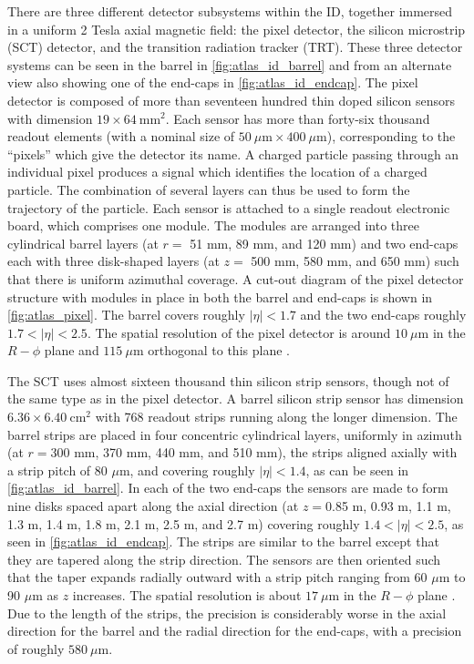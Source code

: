There are three different detector subsystems within the ID, together
immersed in a uniform 2 Tesla axial magnetic field: the pixel detector,
the silicon microstrip (SCT) detector, and the transition radiation
tracker (TRT). These three detector systems can be seen 
in the barrel in \fig\ref{fig:atlas_id_barrel} and from an alternate
view also showing one of the end-caps in \fig\ref{fig:atlas_id_endcap}. 
The pixel detector
is composed of more than seventeen hundred thin doped silicon sensors with 
dimension $19\times 64~\textrm{mm}^2$. Each sensor has more than forty-six
thousand readout elements (with a 
nominal size of $50 ~\mu\textrm{m} \times 400~\mu\textrm{m}$),
corresponding to the ``pixels'' which give the detector its name. 
A charged particle passing through an individual pixel produces a signal
which identifies the location of a charged particle. The combination of 
several layers can thus be used to form the trajectory of the particle. %
Each sensor is attached to a single readout electronic board, which comprises
one module.
The modules are arranged into three cylindrical barrel layers (at 
$r = $ 51 mm, 89 mm, and 120 mm)  and 
two end-caps each with three disk-shaped layers (at $z = $ 500 mm, 580 mm, 
and 650 mm) such that there is uniform
azimuthal coverage. A cut-out diagram of the pixel detector 
structure with modules in place in both the barrel and end-caps is shown 
in \fig\ref{fig:atlas_pixel}. The barrel covers roughly 
$|\eta|<1.7$ and the two end-caps roughly $1.7<|\eta|<2.5$.
The 
spatial resolution of the pixel detector is around $10~\mu\textrm{m}$ in 
the $R-\phi$ plane and $115 ~\mu\textrm{m}$ 
orthogonal to this plane \cite{ATLAS-CONF-2014-047}.



The SCT uses almost sixteen thousand thin silicon strip sensors, though not of the 
same type as in the pixel detector. 
A barrel silicon strip sensor has dimension $6.36\times 6.40~\textrm{cm}^2$
with 768 readout strips running along the longer dimension. The barrel
strips are placed in four concentric cylindrical layers, uniformly in azimuth
(at $r = $300 mm, 370 mm, 440 mm, and 510 mm),
the strips aligned axially with a strip pitch of 
80 $\mu$m, and covering roughly
$|\eta|<1.4$, as can be seen in \fig\ref{fig:atlas_id_barrel}.
In each of the two end-caps the sensors are made to form nine
disks spaced apart along the axial 
direction (at $z = $0.85 m, 0.93 m, 1.1 m, 1.3 m, 1.4 m, 
1.8 m, 2.1 m, 2.5 m, and 2.7 m) covering roughly $1.4 < |\eta|<2.5$, 
as seen in \fig\ref{fig:atlas_id_endcap}. The strips are similar
to the barrel except that they are tapered along the strip direction.
The sensors are then oriented such that the taper expands radially outward
with a strip pitch ranging from 60 $\mu$m to 90 $\mu$m as $z$ increases.
The spatial resolution is about $17~\mu\textrm{m}$
in the $R-\phi$ plane \cite{ATLAS-CONF-2014-047}. 
Due to the length of the strips, the precision is considerably
worse in the axial direction for the barrel and the radial direction for 
the end-caps, with a precision of roughly $580~\mu\textrm{m}$.


